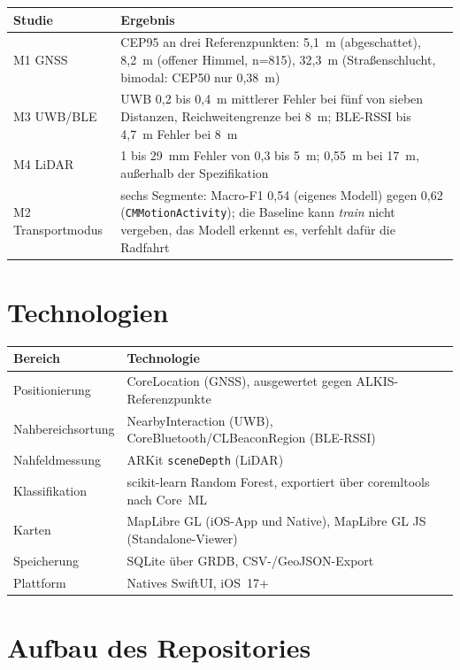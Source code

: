 \documentclass[11pt,a4paper,oneside]{article}
\begin{document}
\begin{table}[H]
\centering
\small
\begin{tabularx}{\linewidth}{@{}lL@{}}
\toprule
\textbf{Studie} & \textbf{Ergebnis} \\
\midrule
M1 GNSS & CEP95 an drei Referenzpunkten: 5{,}1~m (abgeschattet), 8{,}2~m
(offener Himmel, n=815), 32{,}3~m (Straßenschlucht, bimodal: CEP50 nur
0{,}38~m) \\
M3 UWB/BLE & UWB 0{,}2 bis 0{,}4~m mittlerer Fehler bei fünf von sieben
Distanzen, Reichweitengrenze bei 8~m; BLE-RSSI bis 4{,}7~m Fehler bei 8~m \\
M4 LiDAR & 1 bis 29~mm Fehler von 0{,}3 bis 5~m; 0{,}55~m bei 17~m, außerhalb
der Spezifikation \\
M2 Transportmodus & sechs Segmente: Macro-F1 0{,}54 (eigenes Modell) gegen
0{,}62 (\texttt{CMMotionActivity}); die Baseline kann \emph{train} nicht
vergeben, das Modell erkennt es, verfehlt dafür die Radfahrt \\
\bottomrule
\end{tabularx}
\end{table}

\section*{Technologien}

\begin{table}[H]
\centering
\small
\begin{tabularx}{\linewidth}{@{}lL@{}}
\toprule
\textbf{Bereich} & \textbf{Technologie} \\
\midrule
Positionierung & CoreLocation (GNSS), ausgewertet gegen ALKIS-Referenzpunkte \\
Nahbereichsortung & NearbyInteraction (UWB), CoreBluetooth/CLBeaconRegion (BLE-RSSI) \\
Nahfeldmessung & ARKit \texttt{sceneDepth} (LiDAR) \\
Klassifikation & scikit-learn Random Forest, exportiert über coremltools nach Core~ML \\
Karten & MapLibre GL (iOS-App und Native), MapLibre GL JS (Standalone-Viewer) \\
Speicherung & SQLite über GRDB, CSV-/GeoJSON-Export \\
Plattform & Natives SwiftUI, iOS~17+ \\
\bottomrule
\end{tabularx}
\end{table}

\section*{Aufbau des Repositories}
\end{document}
